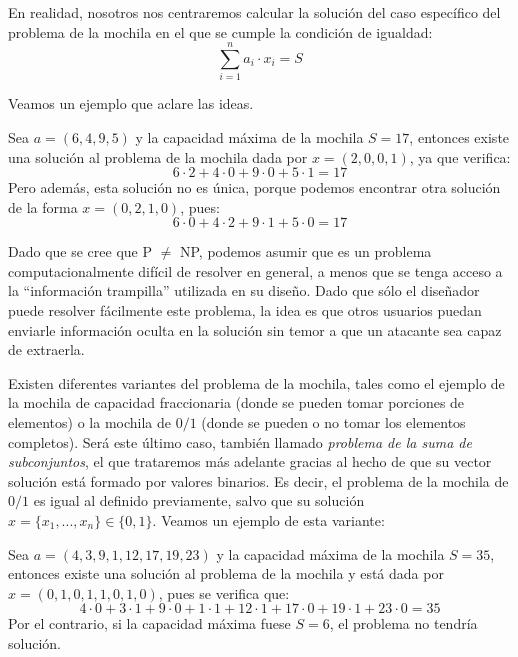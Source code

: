     \begin{observacion}
        En realidad, nosotros nos centraremos calcular la solución del caso específico del problema de la mochila en el que se cumple la condición de igualdad:
        \begin{equation}
            \sum_{i=1}^{n} a_{i} \cdot x_{i} = S
        \end{equation}
    \end{observacion}

    Veamos un ejemplo que aclare las ideas.

    \begin{ejemplo}
        Sea $a = (6, 4, 9, 5)$ y la capacidad máxima de la mochila $S = 17$, entonces existe una solución al problema de la mochila dada por $x = (2, 0, 0, 1)$, ya que verifica:
        \begin{equation} 
            6 \cdot 2 + 4 \cdot 0 + 9 \cdot 0 + 5 \cdot 1 = 17
        \end{equation}
        Pero además, esta solución no es única, porque podemos encontrar otra solución de la forma $x = (0, 2, 1, 0)$, pues:
        \begin{equation}
            6 \cdot 0 + 4 \cdot 2 + 9 \cdot 1 + 5 \cdot 0 = 17
        \end{equation}
    \end{ejemplo}

    Dado que se cree que P $\neq$ NP, podemos asumir que es un problema computacionalmente difícil de resolver en general, a menos que se tenga acceso a la ``información trampilla'' utilizada en su diseño. Dado que sólo el diseñador puede resolver fácilmente este problema, la idea es que otros usuarios puedan enviarle información oculta en la solución sin temor a que un atacante sea capaz de extraerla.

    Existen diferentes variantes del problema de la mochila, tales como el ejemplo de la mochila de capacidad fraccionaria (donde se pueden tomar porciones de elementos) o la mochila de $0/1$ (donde se pueden o no tomar los elementos completos). Será este último caso, también llamado \textit{problema de la suma de subconjuntos}, el que trataremos más adelante gracias al hecho de que su vector solución está formado por valores binarios. Es decir, el problema de la mochila de $0/1$ es igual al definido previamente, salvo que su solución $x = \{ x_{1}, ... , x_{n} \} \in \{ 0, 1 \}$. Veamos un ejemplo de esta variante:

    \begin{ejemplo} \cite{artMS}
        Sea $a = (4, 3, 9, 1, 12, 17, 19, 23)$ y la capacidad máxima de la mochila $S = 35$, entonces existe una solución al problema de la mochila y está dada por $x = (0, 1, 0, 1, 1, 0, 1, 0)$, pues se verifica que:
        \begin{equation} 
            4 \cdot 0 + 3 \cdot 1 + 9 \cdot 0 + 1 \cdot 1 + 12 \cdot 1 + 17 \cdot 0 + 19 \cdot 1 + 23 \cdot 0 = 35
        \end{equation}
        Por el contrario, si la capacidad máxima fuese $S = 6$, el problema no tendría solución.
    \end{ejemplo}

